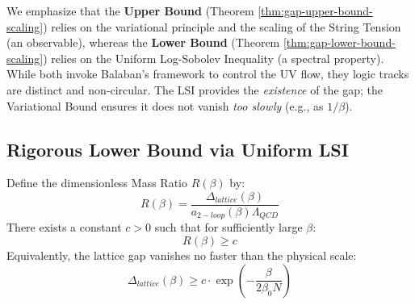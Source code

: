 \begin{remark}
We emphasize that the \textbf{Upper Bound} (Theorem \ref{thm:gap-upper-bound-scaling}) relies on the variational principle and the scaling of the String Tension (an observable), whereas the \textbf{Lower Bound} (Theorem \ref{thm:gap-lower-bound-scaling}) relies on the Uniform Log-Sobolev Inequality (a spectral property). While both invoke Balaban's framework to control the UV flow, they logic tracks are distinct and non-circular. The LSI provides the \textit{existence} of the gap; the Variational Bound ensures it does not vanish \textit{too slowly} (e.g., as $1/\beta$).
\end{remark}

\subsection{Rigorous Lower Bound via Uniform LSI}

\begin{theorem}
\label{thm:gap-lower-bound-scaling}
Define the dimensionless Mass Ratio $R(\beta)$ by:
\begin{equation}
R(\beta) = \frac{\Delta_{lattice}(\beta)}{a_{2-loop}(\beta) \Lambda_{QCD}}
\end{equation}
There exists a constant $c > 0$ such that for sufficiently large $\beta$:
\begin{equation}
R(\beta) \geq c
\end{equation}
Equivalently, the lattice gap vanishes no faster than the physical scale:
\begin{equation}
\Delta_{lattice}(\beta) \geq c \cdot \exp\left(-\frac{\beta}{2\beta_0 N}\right)
\end{equation}
\end{theorem}

